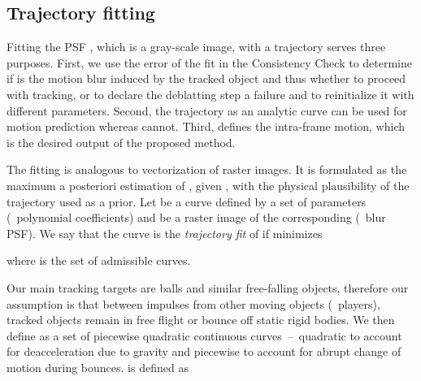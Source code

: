 \documentclass[10pt,twocolumn,letterpaper]{article}
\begin{document}
 \subsection{Trajectory fitting}
\label{sec:fitting}


Fitting the PSF , which is a gray-scale image, with a trajectory  serves three purposes. First, we use the error of the fit in the Consistency Check to determine if 
is the motion blur induced by the tracked object and thus whether to proceed with tracking,
or to declare the deblatting step a failure and 
to reinitialize it with different parameters. Second, the trajectory as an analytic curve can be used for motion prediction whereas  cannot. Third,  defines the intra-frame motion, which is the desired output of the proposed method.



The fitting is analogous to vectorization of raster images. It is formulated as the maximum a posteriori estimation of , given , with the physical plausibility of the trajectory used as a prior. Let  be a curve defined by a set of parameters  (\eg~polynomial coefficients) and  be a raster image of the corresponding  (\ie~blur PSF). We say that the curve  is the \emph{trajectory fit} of  if  minimizes

where  is the set of admissible curves. 


Our main tracking targets are balls and similar free-falling objects, therefore our assumption is that between impulses from other moving objects (\eg~players), tracked objects remain in free flight or bounce off static rigid bodies. We then define  as a set of piecewise quadratic continuous curves~--~quadratic to account for deacceleration due to gravity and piecewise to account for abrupt change of motion during bounces.  is defined as
\end{document}
